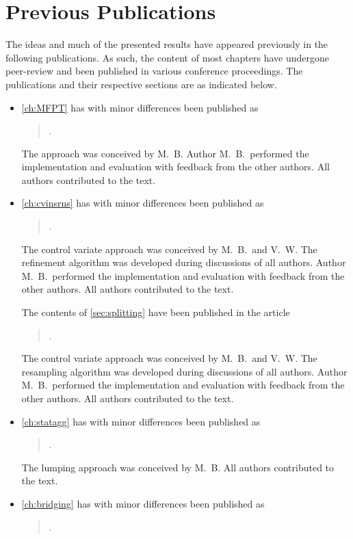 \section{Previous Publications}%
The ideas and much of the presented results have appeared previously in the following publications.
As such, the content of most chapters have undergone peer-review and been published in various conference proceedings.
The publications and their respective sections are as indicated below.

\begin{itemize}

\item \autoref{ch:MFPT} has with minor differences been published as
\begin{quote}
    .
\end{quote}
The approach was conceived by M.\ B.
Author M.\ B.\ performed the implementation and evaluation with feedback from the other authors.
All authors contributed to the text.

\item \autoref{ch:cvinsrns} has with minor differences been published as
\begin{quote}
    .
\end{quote}
The control variate approach was conceived by M.\ B.\ and V.\ W. The refinement algorithm was developed during discussions of all authors.
Author M.\ B.\ performed the implementation and evaluation with feedback from the other authors.
All authors contributed to the text.

The contents of \autoref{sec:splitting} have been published in the article
\begin{quote}
    .
\end{quote}
The control variate approach was conceived by M.\ B.\ and V.\ W. The resampling algorithm was developed during discussions of all authors.
Author M.\ B.\ performed the implementation and evaluation with feedback from the other authors.
All authors contributed to the text.

\item \autoref{ch:statagg} has with minor differences been published as
\begin{quote}
    .
\end{quote}
The lumping approach was conceived by M.\ B.
All authors contributed to the text.

\item \autoref{ch:bridging} has with minor differences been published as
\begin{quote}
    .
\end{quote}
\end{itemize}

